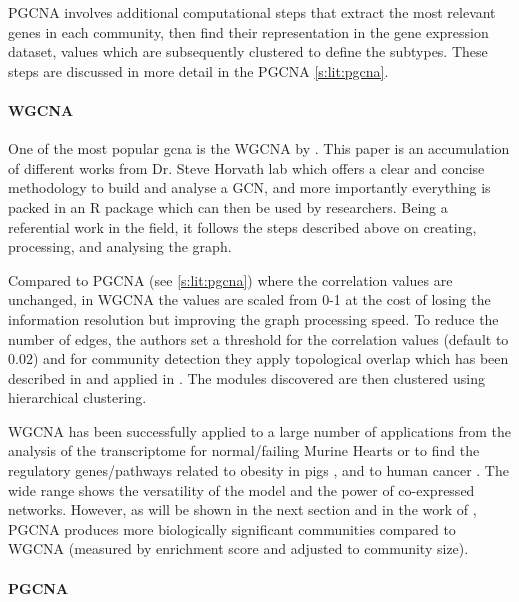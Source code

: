 \gls{PGCNA} involves additional computational steps that extract the most relevant genes in each community, then find their representation in the gene expression dataset, values which are subsequently clustered to define the subtypes. These steps are discussed in more detail in the PGCNA \cref{s:lit:pgcna}.


\paragraph*{WGCNA} \label{s:lit:WGCNA}

One of the most popular \acrfull{gcna} is the WGCNA by \citet{Langfelder2008-sn}. This paper is an accumulation of different works from Dr. Steve Horvath lab which offers a clear and concise methodology to build and analyse a GCN, and more importantly everything is packed in an R package which can then be used by researchers. Being a referential work in the field, it follows the steps described above on creating, processing, and analysing the graph.

Compared to PGCNA (see \cref{s:lit:pgcna}) where the correlation values are unchanged, in WGCNA the values are scaled from 0-1 at the cost of losing the information resolution but improving the graph processing speed. To reduce the number of edges, the authors set a threshold for the correlation values (default to $0.02$) and for community detection they apply topological overlap which has been described in \cite{Zhang2005-xq} and applied in \citep{Yip2007-mr, Li2007-vz, Ravasz2002-au}. The modules discovered are then clustered using hierarchical clustering.

\gls{WGCNA} has been successfully applied to a large number of applications from the analysis of the transcriptome for normal/failing Murine Hearts \citep{Lee2011-wm} or to find the regulatory genes/pathways related to obesity in pigs \citep{Kogelman2014-ea}, and to human cancer \citep{Yang2014-wv, Clarke2013-wd, Care2019-ij}. The wide range shows the versatility of the model and the power of co-expressed networks. However, as will be shown in the next section and in the work of \citet{Care2019-ij}, PGCNA produces more biologically significant communities compared to WGCNA (measured by enrichment score and adjusted to community size).

\paragraph*{PGCNA} \label{s:lit:pgcna}

